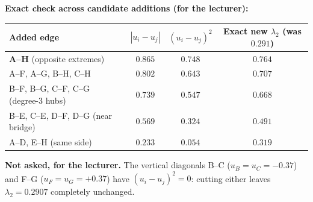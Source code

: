 \documentclass[a4paper, 11pt]{extarticle}
\begin{document}
\smallskip
\textbf{Exact check across candidate additions (for the lecturer):}
\vspace{-0.3em}
\begin{center}
\footnotesize
\begin{tabular}{lccc}
\hline
Added edge & $|u_i - u_j|$ & $(u_i - u_j)^2$ & Exact new $\lambda_2$ (was $0.291$) \\
\hline
\textbf{A--H} (opposite extremes) & $0.865$ & $0.748$ & \textbf{$0.764$} \\
A--F, A--G, B--H, C--H & $0.802$ & $0.643$ & $0.707$ \\
B--F, B--G, C--F, C--G (degree-3 hubs) & $0.739$ & $0.547$ & $0.668$ \\
B--E, C--E, D--F, D--G (near bridge) & $0.569$ & $0.324$ & $0.491$ \\
A--D, E--H (same side) & $0.233$ & $0.054$ & $0.319$ \\
\hline
\end{tabular}
\end{center}
\vspace{-0.3em}
\textbf{Not asked, for the lecturer.} The vertical diagonals B--C ($u_B = u_C = -0.37$) and F--G ($u_F = u_G = +0.37$) have $(u_i - u_j)^2 = 0$: cutting either leaves $\lambda_2 = 0.2907$ completely unchanged.
\end{document}
